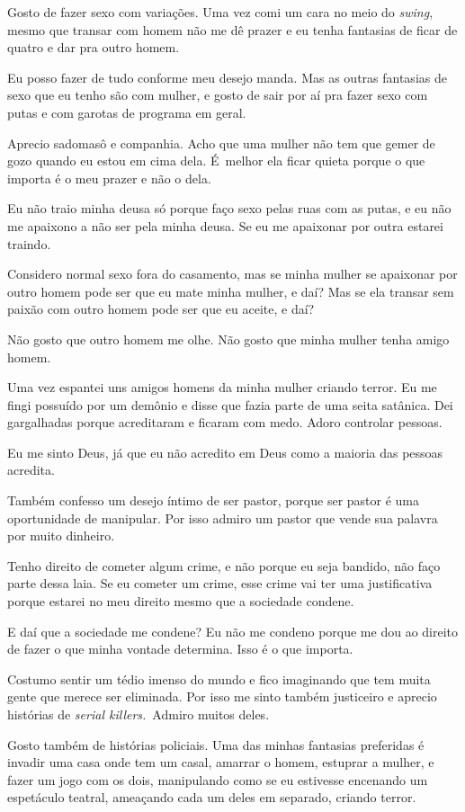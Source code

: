 Gosto de fazer sexo com variações. Uma vez comi um cara no meio do
\emph{swing}, mesmo que transar com homem não me dê prazer e eu tenha
fantasias de ficar de quatro e dar pra outro homem.

Eu posso fazer de tudo conforme meu desejo manda. Mas as outras
fantasias de sexo que eu tenho são com mulher, e gosto de sair por aí
pra fazer sexo com putas e com garotas de programa em geral.

Aprecio sadomasô e companhia. Acho que uma mulher não tem que gemer de
gozo quando eu estou em cima dela. É~melhor ela ficar quieta porque o
que importa é o meu prazer e não o dela.

Eu não traio minha deusa só porque faço sexo pelas ruas com as putas, e
eu não me apaixono a não ser pela minha deusa. Se eu me apaixonar por
outra estarei traindo.

Considero normal sexo fora do casamento, mas se minha mulher se
apaixonar por outro homem pode ser que eu mate minha mulher, e daí? Mas
se ela transar sem paixão com outro homem pode ser que eu aceite, e daí?

Não gosto que outro homem me olhe. Não gosto que minha mulher tenha
amigo homem.

Uma vez espantei uns amigos homens da minha mulher criando terror. Eu me
fingi possuído por um demônio e disse que fazia parte de uma seita
satânica. Dei gargalhadas porque acreditaram e ficaram com medo. Adoro
controlar pessoas.

Eu me sinto Deus, já que eu não acredito em Deus como a maioria das
pessoas acredita.

Também confesso um desejo íntimo de ser pastor, porque ser pastor é uma
oportunidade de manipular. Por isso admiro um pastor que vende sua
palavra por muito dinheiro.

Tenho direito de cometer algum crime, e não porque eu seja bandido, não
faço parte dessa laia. Se eu cometer um crime, esse crime vai ter uma
justificativa porque estarei no meu direito mesmo que a sociedade
condene.

E daí que a sociedade me condene? Eu não me condeno porque me dou ao
direito de fazer o que minha vontade determina. Isso é o que importa.

Costumo sentir um tédio imenso do mundo e fico imaginando que tem muita
gente que merece ser eliminada. Por isso me sinto também justiceiro e
aprecio histórias de \emph{serial killers.}~Admiro muitos deles.

Gosto também de histórias policiais. Uma das minhas fantasias preferidas
é invadir uma casa onde tem um casal, amarrar o homem, estuprar a
mulher, e fazer um jogo com os dois, manipulando como se eu estivesse
encenando um espetáculo teatral, ameaçando cada um deles em separado,
criando terror.

